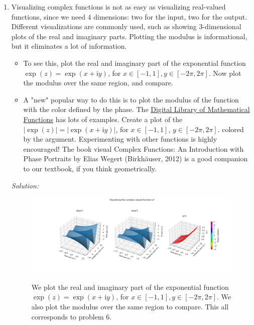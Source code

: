 \documentclass[10pt]{amsart}
\newcommand{\D}{\mathrm{d}}
\newcommand{\I}{\mathrm{i}}
\theoremstyle{nonumberplain}
\begin{document}
\begin{enumerate}[label={\bf {\arabic*}:}]
\begin{eqnarray*}
&=& \int_{-\frac{\pi}{2}}^{\frac{\pi}{2}} \frac{\epsilon^2 }{\epsilon^2 }\frac{\sec^2 \theta} {\sec^2 \theta}  \D \theta \\ \\
&=& \int_{-\frac{\pi}{2}}^{\frac{\pi}{2}} \D \theta \\ \\
&=& \left. \theta \right|_{-\frac{\pi}{2}}^{\frac{\pi}{2}} \\ \\
&=& \frac{\pi}{2} - \left(-\frac{\pi}{2}\right) \\ \\
&=& \pi.
\end{eqnarray*}
\qed \\

\item Visualizing complex functions is not as easy as visualizing
  real-valued functions, since we need 4 dimensions: two for the input,
  two for the output. Different visualizations are commonly used, such
  as showing 3-dimensional plots of the real and imaginary
  parts. Plotting the modulus is informational, but it eliminates a
  lot of information.
  \begin{itemize}
\item To see this, plot the real and imaginary part of the exponential function $\exp (z)=\exp (x+\I y)$, for $x \in[-1,1], y \in[-2 \pi, 2 \pi]$. Now plot the modulus over the same region, and compare.
\item A "new" popular way to do this is to plot the modulus of the
function with the color defined by the phase. The \href{https://dlmf.nist.gov/}{Digital Library of
Mathematical Functions} has lots of examples. Create a plot of the
$|\exp (z)|=|\exp (x+\I y)|$, for $x \in[-1,1]$, $y \in[-2 \pi, 2
\pi]$. colored by the argument. Experimenting with other functions is
highly encouraged! The book visual Complex Functions: An Introduction
with Phase Portraits by Elias Wegert (Birkhäuser, 2012) is a good
companion to our textbook, if you think geometrically.
\end{itemize}
\textit{Solution:} \\

\begin{figure}[h]
	\includegraphics[width=1\textwidth]{exp_z_vis.png}\label{fig:f2}
 	\caption{
		We plot the real and imaginary part of the exponential function $\exp (z)=\exp (x+\I y)$, for $x \in[-1,1], y \in[-2 \pi, 2 \pi]$.
		We also plot the modulus over the same region to compare.
		This all corresponds to problem 6.
	}
\end{figure}


\end{enumerate}
\end{document}

